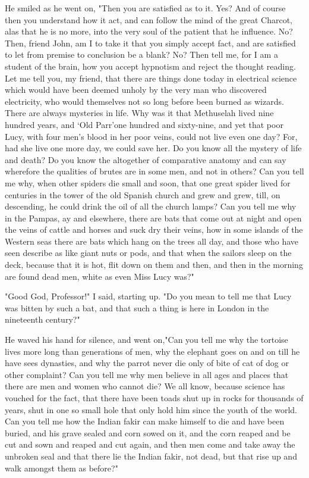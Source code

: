He smiled as he went on, "Then you are satisfied as to it. Yes? And of course then you understand how it act, and can follow the mind of the great Charcot, alas that he is no more, into the very soul of the patient that he influence. No? Then, friend John, am I to take it that you simply accept fact, and are satisfied to let from premise to conclusion be a blank? No? Then tell me, for I am a student of the brain, how you accept hypnotism and reject the thought reading. Let me tell you, my friend, that there are things done today in electrical science which would have been deemed unholy by the very man who discovered electricity, who would themselves not so long before been burned as wizards. There are always mysteries in life. Why was it that Methuselah lived nine hundred years, and `Old Parr'one hundred and sixty-nine, and yet that poor Lucy, with four men's blood in her poor veins, could not live even one day? For, had she live one more day, we could save her. Do you know all the mystery of life and death? Do you know the altogether of comparative anatomy and can say wherefore the qualities of brutes are in some men, and not in others? Can you tell me why, when other spiders die small and soon, that one great spider lived for centuries in the tower of the old Spanish church and grew and grew, till, on descending, he could drink the oil of all the church lamps? Can you tell me why in the Pampas, ay and elsewhere, there are bats that come out at night and open the veins of cattle and horses and suck dry their veins, how in some islands of the Western seas there are bats which hang on the trees all day, and those who have seen describe as like giant nuts or pods, and that when the sailors sleep on the deck, because that it is hot, flit down on them and then, and then in the morning are found dead men, white as even Miss Lucy was?" 

"Good God, Professor!" I said, starting up. "Do you mean to tell me that Lucy was bitten by such a bat, and that such a thing is here in London in the nineteenth century?" 

He waved his hand for silence, and went on,"Can you tell me why the tortoise lives more long than generations of men, why the elephant goes on and on till he have sees dynasties, and why the parrot never die only of bite of cat of dog or other complaint? Can you tell me why men believe in all ages and places that there are men and women who cannot die? We all know, because science has vouched for the fact, that there have been toads shut up in rocks for thousands of years, shut in one so small hole that only hold him since the youth of the world. Can you tell me how the Indian fakir can make himself to die and have been buried, and his grave sealed and corn sowed on it, and the corn reaped and be cut and sown and reaped and cut again, and then men come and take away the unbroken seal and that there lie the Indian fakir, not dead, but that rise up and walk amongst them as before?" 

